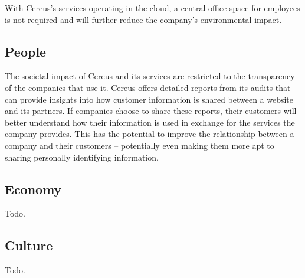 With Cereus's services operating in the cloud, a central office space for employees is not required and will further reduce the company's environmental impact.

\subsection{People}

The societal impact of Cereus and its services are restricted to the transparency of the companies that use it. Cereus offers detailed reports from its audits that can provide insights into how customer information is shared between a website and its partners. If companies choose to share these reports, their customers will better understand how their information is used in exchange for the services the company provides. This has the potential to improve the relationship between a company and their customers -- potentially even making them more apt to sharing personally identifying information.

\subsection{Economy}

Todo.

\subsection{Culture}

Todo.
